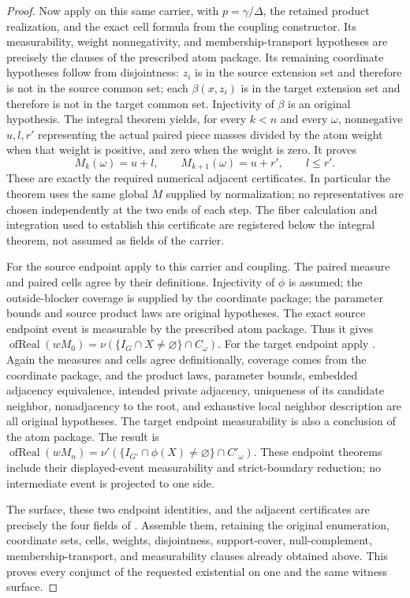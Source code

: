 \begin{proof}
Now apply 
on this same carrier, with $p=\gamma/\Delta$, the retained product
realization, and the exact cell formula from the coupling constructor.
Its measurability, weight nonnegativity, and membership-transport
hypotheses are precisely the clauses of the prescribed atom package.
Its remaining coordinate hypotheses follow from disjointness:
$z_i$ is in the source extension set and therefore is not in the source
common set; each $\beta(x,z_i)$ is in the target extension set and
therefore is not in the target common set. Injectivity of $\beta$ is
an original hypothesis. The integral theorem yields, for every $k<n$
and every $\omega$, nonnegative $u,l,r'$ representing the actual paired
piece masses divided by the atom weight when that weight is positive,
and zero when the weight is zero. It proves
\[
 M_k(\omega)=u+l,\qquad M_{k+1}(\omega)=u+r',\qquad l\le r'.
\]
These are exactly the required numerical adjacent certificates. In
particular the theorem uses the same global $M$ supplied by normalization;
no representatives are chosen independently at the two ends of each step.
The fiber calculation and integration used to establish this certificate
are registered below the integral theorem, not assumed as fields of the
carrier.

For the source endpoint apply
to this carrier and coupling. The paired measure and paired cells agree
by their definitions. Injectivity of $\phi$ is assumed; the outside-blocker
coverage is supplied by the coordinate package; the parameter bounds and
source product laws are original hypotheses. The exact source endpoint
event is measurable by the prescribed atom package. Thus it gives
$\operatorname{ofReal}(wM_0)=\nu(\{I_G\cap X\ne\varnothing\}\cap C_\omega)$.
For the target endpoint apply
.
Again the measures and cells agree definitionally, coverage comes from
the coordinate package, and the product laws, parameter bounds, embedded
adjacency equivalence, intended private adjacency, uniqueness of its
candidate neighbor, nonadjacency to the root, and exhaustive local
neighbor description are all original hypotheses. The target endpoint
measurability is also a conclusion of the atom package. The result is
$\operatorname{ofReal}(wM_n)=\nu'(\{I_{G'}\cap\phi(X)\ne\varnothing\}
\cap C'_\omega)$. These endpoint theorems include their displayed-event
measurability and strict-boundary reduction; no intermediate event is
projected to one side.

The surface, these two endpoint identities, and the adjacent certificates
are precisely the four fields of
.
Assemble them, retaining the original enumeration, coordinate sets, cells,
weights, disjointness, support-cover, null-complement, membership-transport,
and measurability clauses already obtained above. This proves every
conjunct of the requested existential on one and the same witness surface.
\end{proof}
